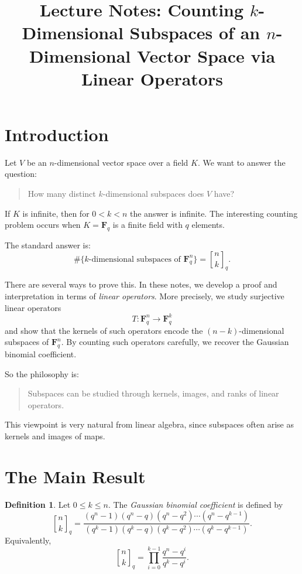 \documentclass[11pt]{article}
\title{Lecture Notes: Counting \(k\)-Dimensional Subspaces of an \(n\)-Dimensional Vector Space via Linear Operators}
\author{}
\date{}
\theoremstyle{definition}
\newtheorem{definition}[theorem]{Definition}
\theoremstyle{remark}
\newcommand{\F}{\mathbf{F}}
\newcommand{\qbinom}[2]{\genfrac{[}{]}{0pt}{}{#1}{#2}_q}
\begin{document}
	
	\maketitle
	
	\tableofcontents
	
	\section{Introduction}
	
	Let \(V\) be an \(n\)-dimensional vector space over a field \(K\). We want to answer the question:
	
	\begin{quote}
		How many distinct \(k\)-dimensional subspaces does \(V\) have?
	\end{quote}
	
	If \(K\) is infinite, then for \(0<k<n\) the answer is infinite. The interesting counting problem occurs when \(K=\F_q\) is a finite field with \(q\) elements.
	
	The standard answer is:
	\[
	\#\{\text{\(k\)-dimensional subspaces of }\F_q^n\}=\qbinom{n}{k}.
	\]
	
	There are several ways to prove this. In these notes, we develop a proof and interpretation in terms of \emph{linear operators}. More precisely, we study surjective linear operators
	\[
	T:\F_q^n\to \F_q^k
	\]
	and show that the kernels of such operators encode the \((n-k)\)-dimensional subspaces of \(\F_q^n\). By counting such operators carefully, we recover the Gaussian binomial coefficient.
	
	So the philosophy is:
	
	\begin{quote}
		Subspaces can be studied through kernels, images, and ranks of linear operators.
	\end{quote}
	
	This viewpoint is very natural from linear algebra, since subspaces often arise as kernels and images of maps.
	
	\section{The Main Result}
	
	\begin{definition}
		Let \(0\le k\le n\). The \emph{Gaussian binomial coefficient} is defined by
		\[
		\qbinom{n}{k}
		=
		\frac{(q^n-1)(q^n-q)(q^n-q^2)\cdots(q^n-q^{k-1})}
		{(q^k-1)(q^k-q)(q^k-q^2)\cdots(q^k-q^{k-1})}.
		\]
		Equivalently,
		\[
		\qbinom{n}{k}
		=
		\prod_{i=0}^{k-1}\frac{q^n-q^i}{q^k-q^i}.
		\]
	\end{definition}
	
\end{document}
